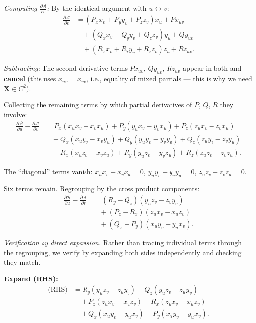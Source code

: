 \documentclass[11pt]{report}
\newcommand{\parti}[2]{\frac{\partial #1}{\partial #2}}
\begin{document}
\textit{Computing $\parti{\mathcal{A}}{v}$:} By the identical argument with $u \leftrightarrow v$:
\begin{align*}
\parti{\mathcal{A}}{v} &= (P_x x_v + P_y y_v + P_z z_v) x_u + P x_{uv} \\
&\quad + (Q_x x_v + Q_y y_v + Q_z z_v) y_u + Q y_{uv} \\
&\quad + (R_x x_v + R_y y_v + R_z z_v) z_u + R z_{uv}.
\end{align*}

\textit{Subtracting:} The second-derivative terms $Px_{uv}$, $Qy_{uv}$, $Rz_{uv}$ appear in both and \textbf{cancel} (this uses $x_{uv} = x_{vu}$, i.e., equality of mixed partials --- this is why we need $\mathbf{X} \in C^2$).

Collecting the remaining terms by which partial derivatives of $P$, $Q$, $R$ they involve:
\begin{align*}
\parti{\mathcal{B}}{u} - \parti{\mathcal{A}}{v} &= P_x(x_u x_v - x_v x_u) + P_y(y_u x_v - y_v x_u) + P_z(z_u x_v - z_v x_u) \\
&\quad + Q_x(x_u y_v - x_v y_u) + Q_y(y_u y_v - y_v y_u) + Q_z(z_u y_v - z_v y_u) \\
&\quad + R_x(x_u z_v - x_v z_u) + R_y(y_u z_v - y_v z_u) + R_z(z_u z_v - z_v z_u).
\end{align*}

The ``diagonal'' terms vanish: $x_u x_v - x_v x_u = 0$, $y_u y_v - y_v y_u = 0$, $z_u z_v - z_v z_u = 0$.

Six terms remain. Regrouping by the cross product components:
\begin{align*}
\parti{\mathcal{B}}{u} - \parti{\mathcal{A}}{v} &= (R_y - Q_z)(y_u z_v - z_u y_v) \\
&\quad + (P_z - R_x)(z_u x_v - x_u z_v) \\
&\quad + (Q_x - P_y)(x_u y_v - y_u x_v).
\end{align*}

\textit{Verification by direct expansion.} Rather than tracing individual terms through the regrouping, we verify by expanding both sides independently and checking they match.

\textbf{Expand (RHS):}
\begin{align*}
\text{(RHS)} &= R_y(y_u z_v - z_u y_v) - Q_z(y_u z_v - z_u y_v) \\
&\quad + P_z(z_u x_v - x_u z_v) - R_x(z_u x_v - x_u z_v) \\
&\quad + Q_x(x_u y_v - y_u x_v) - P_y(x_u y_v - y_u x_v).
\end{align*}
\end{document}
